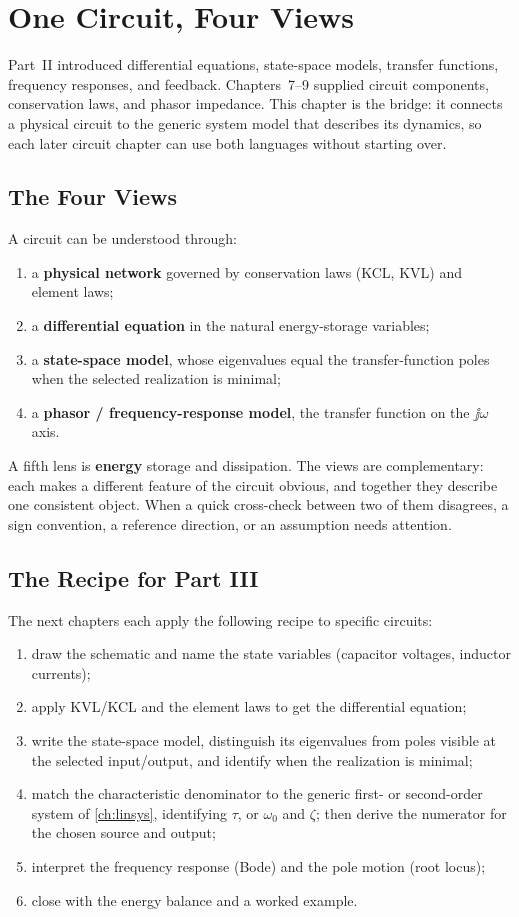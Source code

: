 \chapter{One Circuit, Four Views}
\label{ch:fourviews}
Part~II introduced differential equations, state-space models, transfer functions,
frequency responses, and feedback. Chapters~7--9 supplied circuit components,
conservation laws, and phasor impedance. This chapter is the bridge: it connects a
physical circuit to the generic system model that describes its dynamics, so each
later circuit chapter can use both languages without starting over.

\section{The Four Views}
A circuit can be understood through:
\begin{enumerate}
\item a \textbf{physical network} governed by conservation laws (KCL, KVL) and
element laws;
\item a \textbf{differential equation} in the natural energy-storage variables;
\item a \textbf{state-space model}, whose eigenvalues equal the transfer-function
poles when the selected realization is minimal;
\item a \textbf{phasor / frequency-response model}, the transfer function on the
\(\jj\omega\) axis.
\end{enumerate}
\cite[pp.~199--203, 249--266]{leigh2012control}
A fifth lens is \textbf{energy} storage and dissipation. The views are
complementary: each makes a different feature of
the circuit obvious, and together they describe one consistent object. When a
quick cross-check between two of them disagrees, a sign convention, a reference
direction, or an assumption needs attention.

\section{The Recipe for Part III}
The next chapters each apply the following recipe to specific circuits:
\begin{enumerate}
\item draw the schematic and name the state variables (capacitor voltages,
inductor currents);
\item apply KVL/KCL and the element laws to get the differential equation;
\item write the state-space model, distinguish its eigenvalues from poles visible
at the selected input/output, and identify when the realization is minimal;
\item match the characteristic denominator to the generic first- or second-order
system of \cref{ch:linsys}, identifying \(\tau\), or \(\omega_0\) and \(\zeta\);
then derive the numerator for the chosen source and output;
\item interpret the frequency response (Bode) and the pole motion (root locus);
\item close with the energy balance and a worked example.
\end{enumerate}

